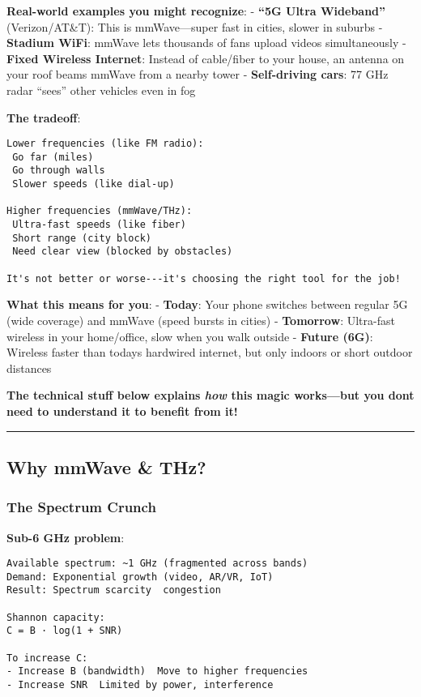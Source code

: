 \textbf{Real-world examples you might recognize}: - \textbf{``5G Ultra
Wideband''} (Verizon/AT\&T): This is mmWave---super fast in cities,
slower in suburbs - \textbf{Stadium WiFi}: mmWave lets thousands of fans
upload videos simultaneously - \textbf{Fixed Wireless Internet}: Instead
of cable/fiber to your house, an antenna on your roof beams mmWave from
a nearby tower - \textbf{Self-driving cars}: 77 GHz radar ``sees'' other
vehicles even in fog

\textbf{The tradeoff}:

\begin{verbatim}
Lower frequencies (like FM radio):
 Go far (miles)
 Go through walls
 Slower speeds (like dial-up)

Higher frequencies (mmWave/THz):
 Ultra-fast speeds (like fiber)
 Short range (city block)
 Need clear view (blocked by obstacles)

It's not better or worse---it's choosing the right tool for the job!
\end{verbatim}

\textbf{What this means for you}: - \textbf{Today}: Your phone switches
between regular 5G (wide coverage) and mmWave (speed bursts in cities) -
\textbf{Tomorrow}: Ultra-fast wireless in your home/office, slow when
you walk outside - \textbf{Future (6G)}: Wireless faster than
today\textquotesingle s hardwired internet, but only indoors or short
outdoor distances

\textbf{The technical stuff below explains \emph{how} this magic
works---but you don\textquotesingle t need to understand it to
benefit from it!}

\begin{center}\rule{0.5\linewidth}{0.5pt}\end{center}

\subsection{\texorpdfstring{ Why mmWave \&
THz?}{ Why mmWave \& THz?}}\label{why-mmwave-thz}

\subsubsection{The Spectrum Crunch}\label{the-spectrum-crunch}

\textbf{Sub-6 GHz problem}:

\begin{verbatim}
Available spectrum: ~1 GHz (fragmented across bands)
Demand: Exponential growth (video, AR/VR, IoT)
Result: Spectrum scarcity  congestion

Shannon capacity:
C = B · log(1 + SNR)

To increase C:
- Increase B (bandwidth)  Move to higher frequencies 
- Increase SNR  Limited by power, interference
\end{verbatim}

